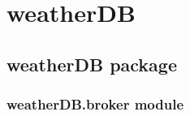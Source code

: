 \documentclass[letterpaper,10pt,english]{sphinxmanual}
\begin{document}
\chapter{weatherDB}
\label{\detokenize{modules:weatherdb}}\label{\detokenize{modules::doc}}

\section{weatherDB package}
\label{\detokenize{weatherDB:weatherdb-package}}\label{\detokenize{weatherDB::doc}}

\subsection{weatherDB.broker module}
\label{\detokenize{weatherDB:module-weatherDB.broker}}\label{\detokenize{weatherDB:weatherdb-broker-module}}
\end{document}
